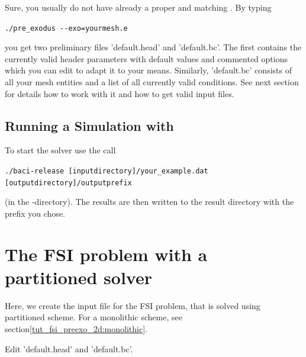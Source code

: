 Sure, you usually do not have already a proper \head and matching \bc. By
typing
\begin{center}
  \verb|./pre_exodus --exo=yourmesh.e|
\end{center}
you get two preliminary files
'default.head' and 'default.bc'. The first contains the currently valid header
parameters with default values and commented options which you can edit to
adapt it to your means. Similarly, 'default.bc' consists of all your mesh
entities and a list of all currently valid conditions. See next section for
details how to work with it and how to get valid input files.

\subsection{Running a Simulation with \baci{}}
\label{tut_fsi_preexo_2d:baci}
To start the solver use the call 
\begin{center}
	\verb|./baci-release [inputdirectory]/your_example.dat [outputdirectory]/outputprefix|
\end{center}
(in the \baci{}-directory). The results are then written to
the result directory with the prefix you chose.

\section{The FSI problem with a partitioned solver}
Here, we create the \baci{} input file for the FSI problem, that is solved using
partitioned scheme. For a monolithic scheme, see
section\ref{tut_fsi_preexo_2d:monolithic}.

Edit 'default.head' and 'default.bc'.

